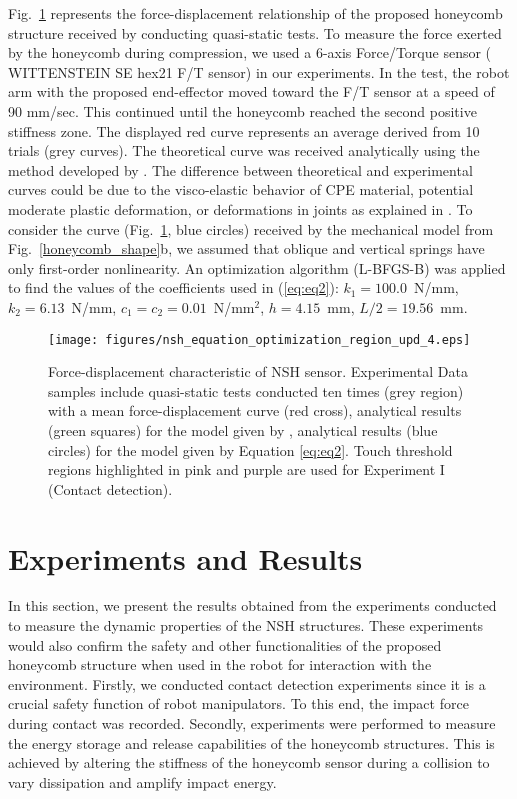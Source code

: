\documentclass[lettersize,journal]{IEEEtran}
\begin{document}
Fig.~\ref{honeycomb_graph_optimization} represents the force-displacement relationship of the proposed honeycomb structure received by conducting quasi-static tests. To measure the force exerted by the honeycomb during compression, we used a  6-axis Force/Torque sensor ( WITTENSTEIN SE hex21 F/T sensor) in our experiments. In the test, the robot arm with the proposed end-effector moved toward the F/T sensor at a speed of 90 mm/sec. This continued until the honeycomb reached the second positive stiffness zone. The displayed red curve represents an average derived from 10 trials (grey curves). The theoretical curve was received analytically using the method developed by \cite{zhakatayev2020analytical}. The difference between theoretical and experimental curves could be due to the visco-elastic behavior of CPE material, potential moderate plastic deformation, or deformations in joints as explained in \cite{correa2015negative}. To consider the curve (Fig.~\ref{honeycomb_graph_optimization}, blue circles) received by the mechanical model from Fig.~\ref{honeycomb_shape}b, we assumed that oblique and vertical springs have only first-order nonlinearity. An  optimization algorithm (L-BFGS-B) was applied to find the values of the coefficients used in (\ref{eq:eq2}): $k_1= 100.0 $~N/mm, $k_2= 6.13$~N/mm, $c_1=c_2= 0.01$~N/mm$^2$, $h= 4.15$~mm, $L/2= 19.56$~mm. 
 \begin{figure}[thpb]
\centering
    \texttt{[image: figures/nsh\_equation\_optimization\_region\_upd\_4.eps]}
\caption {Force-displacement characteristic of NSH sensor. Experimental Data samples include quasi-static tests conducted ten times (grey region) with a mean force-displacement curve (red cross), analytical results (green squares) for the model given by \cite{zhakatayev2020analytical}, analytical results (blue circles) for the model given by Equation \ref{eq:eq2}. Touch threshold regions highlighted in pink and purple are used for Experiment I (Contact detection).}
\label{honeycomb_graph_optimization}
\vspace{-3mm}
\end{figure}

\section{Experiments and Results}
\label{sec:experiments}

In this section, we present the results obtained from the experiments conducted to measure the dynamic properties of the NSH structures. These experiments would also confirm the safety and other functionalities of the proposed honeycomb structure when used in the robot for interaction with the environment. Firstly, we conducted contact detection experiments since it is a crucial safety function of robot manipulators. To this end, the impact force during contact was recorded. Secondly, experiments were performed to measure the energy storage and release capabilities of the honeycomb structures. This is achieved by altering the stiffness of the honeycomb sensor during a collision to vary dissipation and amplify impact energy.
\end{document}
